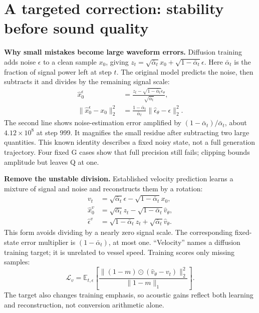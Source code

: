 \documentclass[runningheads,orivec]{llncs}
\begin{document}
\section{A targeted correction: stability before sound quality}
\label{sec:correction}

\textbf{Why small mistakes become large waveform errors.} Diffusion training adds noise $\epsilon$ to a clean sample $x_0$, giving $z_t=\sqrt{\bar\alpha_t}x_0+\sqrt{1-\bar\alpha_t}\epsilon$. Here $\bar\alpha_t$ is the fraction of signal power left at step $t$. The original model predicts the noise, then subtracts it and divides by the remaining signal scale:
\begin{equation}
\begin{aligned}
\hat x_0^{\epsilon}&=\frac{z_t-\sqrt{1-\bar\alpha_t}\hat\epsilon_\theta}{\sqrt{\bar\alpha_t}},\\
\|\hat x_0^{\epsilon}-x_0\|_2^2&=\frac{1-\bar\alpha_t}{\bar\alpha_t}\|\hat\epsilon_\theta-\epsilon\|_2^2.
\end{aligned}\label{eq:amplification}
\end{equation}
The second line shows noise-estimation error amplified by $(1-\bar\alpha_t)/\bar\alpha_t$, about $4.12\times10^8$ at step 999. It magnifies the small residue after subtracting two large quantities. This known identity describes a fixed noisy state, not a full generation trajectory. Four fixed G cases show that full precision still fails; clipping bounds amplitude but leaves Q at one.

\textbf{Remove the unstable division.} Established velocity prediction \cite{salimans} learns a mixture of signal and noise and reconstructs them by a rotation:
\begin{equation}
\begin{aligned}
v_t&=\sqrt{\bar\alpha_t}\epsilon-\sqrt{1-\bar\alpha_t}x_0,\\
\hat x_0^{v}&=\sqrt{\bar\alpha_t}z_t-\sqrt{1-\bar\alpha_t}\hat v_\theta,\\
\hat\epsilon^{v}&=\sqrt{1-\bar\alpha_t}z_t+\sqrt{\bar\alpha_t}\hat v_\theta.
\end{aligned}\label{eq:velocity}
\end{equation}
This form avoids dividing by a nearly zero signal scale. The corresponding fixed-state error multiplier is $(1-\bar\alpha_t)$, at most one. ``Velocity'' names a diffusion training target; it is unrelated to vessel speed. Training scores only missing samples:
\begin{equation}
\mathcal L_v=\mathbb E_{t,\epsilon}\!\left[
\frac{\|(1-m)\odot(\hat v_\theta-v_t)\|_2^2}{\|1-m\|_1}
\right].\label{eq:velocity_loss}
\end{equation}
The target also changes training emphasis, so acoustic gains reflect both learning and reconstruction, not conversion arithmetic alone.
\end{document}
